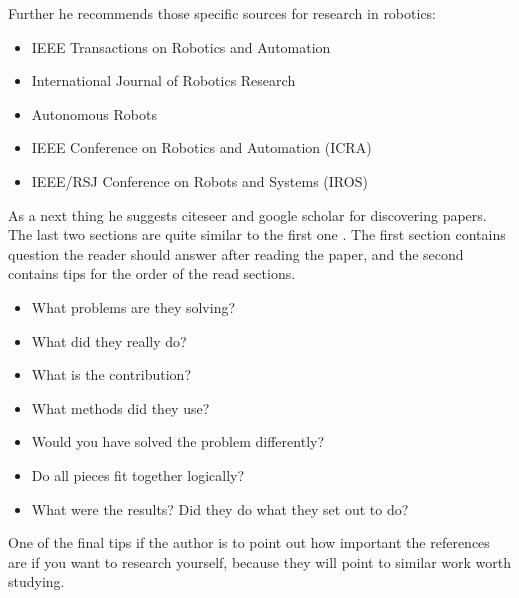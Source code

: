\documentclass{article}
\begin{document}
Further he recommends those specific sources for research in robotics:  
\begin{itemize}
  \item IEEE Transactions on Robotics and Automation
  \item International Journal of Robotics Research
  \item Autonomous Robots
  \item IEEE Conference on Robotics and Automation (ICRA)
  \item IEEE/RSJ Conference on Robots and Systems (IROS)
\end{itemize}

As a next thing he suggests citeseer and google scholar for discovering papers. The last two sections are quite similar to the first one
\cite{griswold2009read}. The first section contains question the reader should answer after reading the paper, and the second contains
tips for the order of the read sections.
\begin{itemize}
  \item What problems are they solving?
  \item What did they really do?
  \item What is the contribution?
  \item What methods did they use? 
  \item Would you have solved the problem differently?
  \item Do all pieces fit together logically?
  \item What were the results? Did they do what they set out to do?
\end{itemize}
One of the final tips if the author is to point out how important the references are if you want to research yourself, because 
they will point to similar work worth studying.




\end{document}
